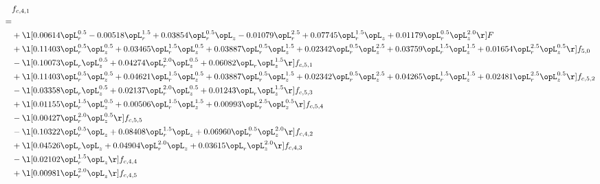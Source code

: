 \begin{alignat}{2} 
\label{eq:f_41_2} 
& f_{c,4,1} \nonumber \\ 
 = \\ 
& + \l[  0.00614 \opL_r^{0.5}   -0.00518 \opL_r^{1.5} +  0.03854 \opL_r^{0.5} \opL_z   -0.01079 \opL_r^{2.5} +  0.07745 \opL_r^{1.5} \opL_z +  0.01179 \opL_r^{0.5} \opL_z^{2.0}  \r] F \nonumber \\ 
& + \l[  0.11403 \opL_r^{0.5} \opL_z^{0.5} +  0.03465 \opL_r^{1.5} \opL_z^{0.5} +  0.03887 \opL_r^{0.5} \opL_z^{1.5} +  0.02342 \opL_r^{0.5} \opL_z^{2.5} +  0.03759 \opL_r^{1.5} \opL_z^{1.5} +  0.01654 \opL_r^{2.5} \opL_z^{0.5}  \r] f_{5,0} \nonumber \\ 
& - \l[  0.10073 \opL_r \opL_z^{0.5} +  0.04274 \opL_r^{2.0} \opL_z^{0.5} +  0.06082 \opL_r \opL_z^{1.5}  \r] f_{c,5,1} \nonumber \\ 
& + \l[  0.11403 \opL_r^{0.5} \opL_z^{0.5} +  0.04621 \opL_r^{1.5} \opL_z^{0.5} +  0.03887 \opL_r^{0.5} \opL_z^{1.5} +  0.02342 \opL_r^{0.5} \opL_z^{2.5} +  0.04265 \opL_r^{1.5} \opL_z^{1.5} +  0.02481 \opL_r^{2.5} \opL_z^{0.5}  \r] f_{c,5,2} \nonumber \\ 
& - \l[  0.03358 \opL_r \opL_z^{0.5} +  0.02137 \opL_r^{2.0} \opL_z^{0.5} +  0.01243 \opL_r \opL_z^{1.5}  \r] f_{c,5,3} \nonumber \\ 
& + \l[  0.01155 \opL_r^{1.5} \opL_z^{0.5} +  0.00506 \opL_r^{1.5} \opL_z^{1.5} +  0.00993 \opL_r^{2.5} \opL_z^{0.5}  \r] f_{c,5,4} \nonumber \\ 
& - \l[  0.00427 \opL_r^{2.0} \opL_z^{0.5}  \r] f_{c,5,5} \nonumber \\ 
& - \l[  0.10322 \opL_r^{0.5} \opL_z +  0.08408 \opL_r^{1.5} \opL_z +  0.06960 \opL_r^{0.5} \opL_z^{2.0}  \r] f_{c,4,2} \nonumber \\ 
& + \l[  0.04526 \opL_r \opL_z +  0.04904 \opL_r^{2.0} \opL_z +  0.03615 \opL_r \opL_z^{2.0}  \r] f_{c,4,3} \nonumber \\ 
& - \l[  0.02102 \opL_r^{1.5} \opL_z  \r] f_{c,4,4} \nonumber \\ 
& + \l[  0.00981 \opL_r^{2.0} \opL_z  \r] f_{c,4,5} \nonumber \\ 
\end{alignat} 



